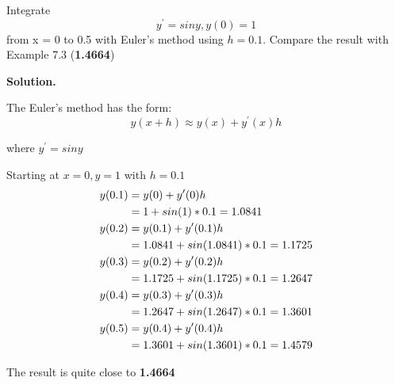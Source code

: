 \begin{exercise}{3} %
Integrate $$y^\prime = siny, y(0) = 1$$
from x = 0 to 0.5 with Euler’s method using \(h = 0.1\). Compare the result with Example 7.3 (\textbf{1.4664})

\textbf{Solution.}

The Euler's method has the form:
$$y(x + h) \approx y(x) + y^\prime(x)h$$ 

where $y^\prime=sin y$

Starting at $x=0,y=1$ with $h=0.1$
\begin{align}
y(0.1) &= y(0) + y^\prime(0)h \notag \\
&=1 + sin(1)*0.1 = 1.0841 \notag \\
y(0.2) &= y(0.1) + y^\prime(0.1)h \notag \\
&=1.0841 + sin(1.0841)*0.1 = 1.1725 \notag \\
y(0.3) &= y(0.2) + y^\prime(0.2)h \notag \\
&=1.1725 + sin(1.1725)*0.1 = 1.2647 \notag \\
y(0.4) &= y(0.3) + y^\prime(0.3)h \notag \\
&=1.2647 + sin(1.2647)*0.1 = 1.3601 \notag \\
y(0.5) &= y(0.4) + y^\prime(0.4)h \notag \\
&=1.3601 + sin(1.3601)*0.1 = 1.4579 \notag
\end{align}

The result is quite close to \textbf{1.4664}

\end{exercise}


